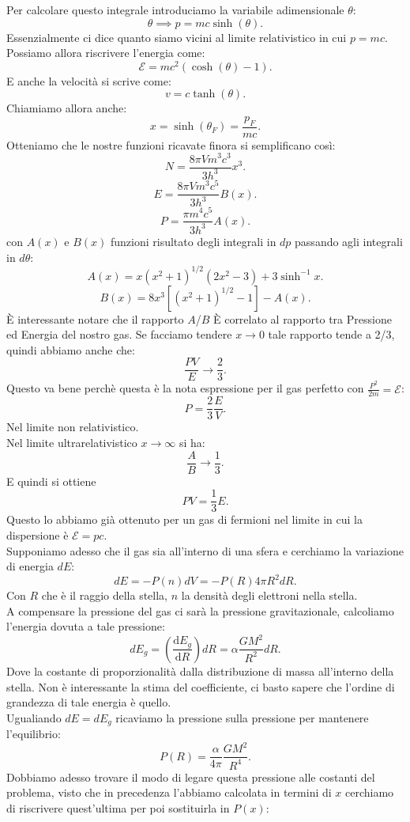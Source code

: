 Per calcolare questo integrale introduciamo la variabile adimensionale $\theta $:
\[
	\theta \implies p = mc\sinh( \theta ) 
.\] 
Essenzialmente ci dice quanto siamo vicini al limite relativistico in cui $p = mc$. Possiamo allora riscrivere l'energia come:
\[
	\mathcal{E} = mc^2\left( \cosh( \theta ) -1  \right) 
.\] 
E anche la velocità si scrive come:
\[
	v = c \tanh( \theta ) 
.\] 
Chiamiamo allora anche:
\[
	x = \sinh( \theta_{F})  = \frac{p_{F}}{mc}
.\] 
Otteniamo che le nostre funzioni ricavate finora si semplificano così:
\[
	N = \frac{8\pi V m^3c^3}{3h^3}x^3
.\] 
\[
	E = \frac{8\pi V m^3c^5}{3h^3}B (x ) 
.\] 
\[
	P = \frac{\pi m^{4}c ^{5}}{3h^3}A ( x) 
.\] 
con $A( x) $ e $B ( x)$ funzioni risultato degli integrali in $dp$ passando agli integrali in $d\theta $:
\[
	A( x) = x\left( x^2+1 \right) ^{1 /2}\left( 2x^2 - 3 \right) + 3 \sinh^{-1}x 
.\] 
\[
	B( x) = 8x^3\left[ \left( x^2+ 1 \right)^{1 /2}-1 \right] - A( x) 
.\] 
È interessante notare che il rapporto $A$/$B$ È correlato al rapporto tra Pressione ed Energia del nostro gas. Se facciamo tendere $x \to 0$ tale rapporto tende a 2/3, quindi abbiamo anche che:
\[
	\frac{PV}{E} \to  \frac{2}{3}
.\] 
Questo va bene perchè questa è la nota espressione per il gas perfetto con $\frac{P^2}{2m} = \mathcal{E} $:
\[
	P = \frac{2}{3}\frac{E}{V}
.\] 
Nel limite non relativistico. \\
Nel limite ultrarelativistico $x \to \infty $ si ha:
\[
	\frac{A}{B} \to \frac{1}{3}
.\] 
E quindi si ottiene 
\[
	PV = \frac{1}{3}E
.\] 
Questo lo abbiamo già ottenuto per un gas di fermioni nel limite in cui la dispersione è $\mathcal{E} = pc$.\\
Supponiamo adesso che il gas sia all'interno di una sfera e cerchiamo la variazione di energia $dE$:
\[
	dE = - P( n) dV = -P( R) 4\pi R^2dR
.\] 
Con $R$ che è il raggio della stella, $n$ la densità degli elettroni nella stella. \\
A compensare la pressione del gas ci sarà la pressione gravitazionale, calcoliamo l'energia dovuta a tale pressione:
\[
	dE_{g}= \left( \frac{\mbox{d} E_{g}}{\mbox{d} R}  \right) dR = 
	\alpha \frac{GM^2}{R^2}dR
.\] 
Dove la costante di proporzionalità dalla distribuzione di massa all'interno della stella. Non è interessante la stima del coefficiente, ci basto sapere che l'ordine di grandezza di tale energia è quello.\\
Ugualiando $dE = dE_{g}$ ricaviamo la pressione sulla pressione per mantenere l'equilibrio:
\[
	P( R) = \frac{\alpha }{4\pi}\frac{GM^2}{R^4}
.\] 
Dobbiamo adesso trovare il modo di legare questa pressione alle costanti del problema, visto che in precedenza l'abbiamo calcolata in termini di $x$ cerchiamo di riscrivere quest'ultima per poi sostituirla in $P( x) $:
